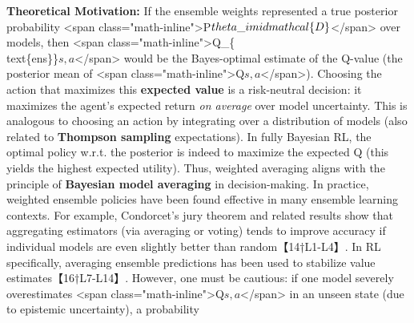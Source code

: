 \documentclass{article}
\begin{document}
\textbf{Theoretical Motivation:} If the ensemble weights represented a true posterior probability <span class="math-inline">P\(\\theta\_i \\mid \\mathcal\{D\}\)</span> over models, then <span class="math-inline">Q\_\{\\text\{ens\}\}\(s,a\)</span> would be the Bayes-optimal estimate of the Q-value (the posterior mean of <span class="math-inline">Q\(s,a\)</span>). Choosing the action that maximizes this \textbf{expected value} is a risk-neutral decision: it maximizes the agent’s expected return \textit{on average} over model uncertainty. This is analogous to choosing an action by integrating over a distribution of models (also related to \textbf{Thompson sampling} expectations). In fully Bayesian RL, the optimal policy w.r.t. the posterior is indeed to maximize the expected Q (this yields the highest expected utility). Thus, weighted averaging aligns with the principle of \textbf{Bayesian model averaging} in decision-making. In practice, weighted ensemble policies have been found effective in many ensemble learning contexts. For example, Condorcet’s jury theorem and related results show that aggregating estimators (via averaging or voting) tends to improve accuracy if individual models are even slightly better than random【14†L1-L4】. In RL specifically, averaging ensemble predictions has been used to stabilize value estimates【16†L7-L14】. However, one must be cautious: if one model severely overestimates <span class="math-inline">Q\(s,a\)</span> in an unseen state (due to epistemic uncertainty), a probability
\end{document}

